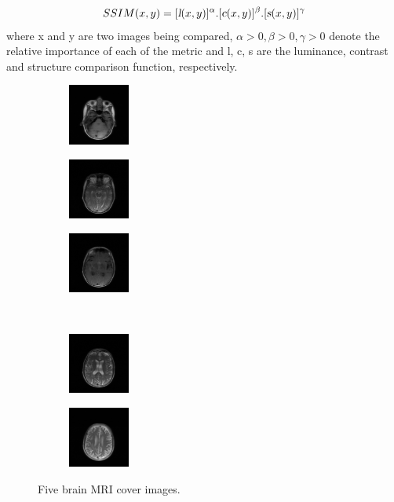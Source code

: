 \documentclass[conference]{IEEEtran}
\begin{document}
\begin{align}
SSIM(x,y) = [\textsl{l}(x,y)]^{\alpha}.[\textsl{c}(x,y)]^{\beta}.[\textsl{s}(x,y)]^{\gamma}
\label{eq:ssim} 
\end{align}
where x and y are two images being compared, \(\alpha > 0, \beta > 0, \gamma > 0\) denote the relative importance of each of the metric and l, c, s are the luminance, contrast and structure comparison function, respectively. \\
\begin{figure}
\centering
\begin{subfigure}[]{}
	\centering
	\includegraphics[width=2cm,height=2cm]{./image/IMG-0004-00001}
\end{subfigure}
\begin{subfigure}[]{}
	\includegraphics[width=2cm,height=2cm]{./image/IMG-0004-00002}
\end{subfigure}
\begin{subfigure}[]{}
	\centering
	\includegraphics[width=2cm,height=2cm]{./image/IMG-0004-00003}
\end{subfigure}
\\
\begin{subfigure}[]{} 
	\centering
	\includegraphics[width=2cm,height=2cm]{./image/IMG-0004-00004}
\end{subfigure}
\begin{subfigure}[]{}
	\centering
	\includegraphics[width=2cm,height=2cm]{./image/IMG-0004-00005}
\end{subfigure}
\caption{Five brain MRI cover images.}
\label{fig:inputImages}
\end{figure}
\end{document}
